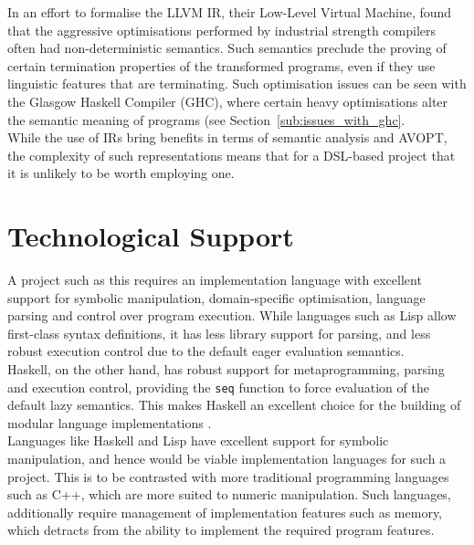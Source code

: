 \documentclass[a4paper,11pt]{report}
\begin{document}
In an effort to formalise the LLVM IR, their Low-Level Virtual Machine, \citet{Zhao:2012:FLI:2103621.2103709} found that the aggressive optimisations performed by industrial strength compilers often had non-deterministic semantics.
Such semantics preclude the proving of certain termination properties of the transformed programs, even if they use linguistic features that are terminating.
Such optimisation issues can be seen with the Glasgow Haskell Compiler (GHC), where certain heavy optimisations alter the semantic meaning of programs (see Section~\ref{sub:issues_with_ghc}.\\

While the use of IRs bring benefits in terms of semantic analysis and AVOPT, the complexity of such representations means that for a DSL-based project that it is unlikely to be worth employing one.



\section{Technological Support} %
\label{sec:technological_support}
A project such as this requires an implementation language with excellent support for symbolic manipulation, domain-specific optimisation, language parsing and control over program execution.
While languages such as Lisp allow first-class syntax definitions, it has less library support for parsing, and less robust execution control due to the default eager evaluation semantics. \\

Haskell, on the other hand, has robust support for metaprogramming, parsing and execution control, providing the \lstinline{seq} function to force evaluation of the default lazy semantics. 
This makes Haskell an excellent choice for the building of modular language implementations \citep{hudak1996building}.\\

Languages like Haskell and Lisp have excellent support for symbolic manipulation, and hence would be viable implementation languages for such a project. 
This is to be contrasted with more traditional programming languages such as C++, which are more suited to numeric manipulation.
Such languages, additionally require management of implementation features such as memory, which detracts from the ability to implement the required program features.\\
\end{document}
